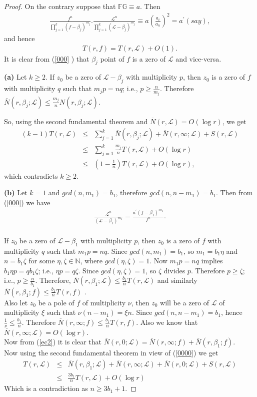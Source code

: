 \documentclass[a4paper,draft]{amsproc}
\theoremstyle{plain}
\theoremstyle{definition}
\theoremstyle{remark}
\newcommand{\ol}{\overline}
\newcommand{\bea}{\begin{eqnarray}}
\newcommand{\eea}{\end{eqnarray}}
\renewcommand{\d}{\displaystyle}
\numberwithin{equation}{section}
\renewcommand{\leq}{\leqslant}\renewcommand{\geq}{\geqslant}
\begin{document}
\begin{proof}
On the contrary suppose that $\mathbb{F} \mathbb{G}\equiv a$. Then 
\bea\label{000} \d\frac{f^n}{\prod\limits_{j=1}^{k}(f-\beta_j)^{m_{j}}}.\d\frac{\mathcal{L}^n}{\prod\limits_{j=1}^{k}(\mathcal{L}-\beta_j)^{m_{j}}}\equiv a\left(\frac{a_{i}}{a_{n}}\right)^{2}=a^{'}(say),\eea and hence   \bea\label{0000} T(r,f)= T(r,\mathcal{L})+O(1).\eea 		
It is clear from (\ref{000} ) that  $\beta_j$ point of $f$ is a zero  of $\mathcal{L}$ and vice-versa. 

{\bf(a)} Let $k\geq 2$.
If $z_0$ be a zero of $\mathcal{L}-\beta_j$ with
multiplicity $p$, then $z_0$ is a zero of $f$ with multiplicity $q$ such that $m_jp=nq$; i.e., $p\d\geq \frac{n}{m_j}$. Therefore  $\ol{N}(r,\beta_j;\mathcal{L})\leq \d\frac{m_j}{n}N(r,\beta_j;\mathcal{L})$. %

So, using the second fundamental theorem and $\ol{N}(r,\mathcal{L})=O(\log r)$, we get \bea\nonumber (k-1)T(r,\mathcal{L})&\leq& \sum_{j=1}^{k}\ol{N}(r,\beta_j;\mathcal{L})+\ol{N}(r,\infty;\mathcal{L})+S(r,\mathcal{L}) \nonumber\\ & 
\leq& \sum_{j=1}^{k}\frac{m_j}{n}T(r,\mathcal{L})+O(\log r)\nonumber\\&
\leq& (1-\frac{1}{n})T(r,\mathcal{L})+O(\log r)\nonumber,
\eea
which  contradicts $k\geq2$.

{\bf(b)} Let $k=1$ and $gcd(n,m_1)=b_1$, therefore $gcd(n,n-m_1)=b_1$. Then from (\ref{000}) we have 
\bea\label{ec2} \frac{\mathcal{L}^n}{(\mathcal{L}-\beta_1)^{m_1}}=\frac{a^{'}(f-\beta_1)^{m_1}}{f^n}. \eea\\
If $z_0$ be a zero of $\mathcal{L}-\beta_1$ with
multiplicity $p$, then $z_0$ is a zero of $f$ with multiplicity $q$ such that $m_1p=nq$. Since $gcd(n,m_1)=b_1$, so $m_1=b_1 \eta$ and $n=b_1 \zeta$ for some $\eta,\zeta \in \mathbb{N}$, where $gcd(\eta,\zeta)=1$. Now $m_1 p = nq$ implies $b_1\eta p=q b_1\zeta$; i.e.,  $\eta p=q\zeta$. Since $gcd(\eta,\zeta)=1$, so $\zeta$ divides $p$. Therefore $p \geq \zeta$; i.e., $p\d\geq \frac{n}{b_1}$. Therefore, $\ol{N}(r,\beta_1;\mathcal{L})\leq \frac{b_1}{n}T(r,\mathcal{L})$ and similarly $\ol{N}(r,\beta_1;f)\leq \frac{b_1}{n}T(r,f)$ .\\
Also let $z_0$ be a pole of $f$ of multiplicity $\nu$, then $z_0$ will be a zero of $\mathcal{L}$ of multiplicity $\xi$ such that $\nu (n-m_1) = \xi n$. Since $gcd(n,n-m_1)=b_1$, hence $\frac{1}{\nu}\leq \frac{b_1}{n} $. Therefore $\ol{N}(r,\infty;f)\leq \frac{b_1}{n}T(r,f).$ Also we know that $\ol{N}(r,\infty;\mathcal{L})=O(\log r).$\\
Now from (\ref{ec2}) it is clear that $\ol{N}(r,0;\mathcal{
L})= \ol{N}(r,\infty;f)+\ol{N}(r,\beta_1;f).$ \\
Now using the second fundamental theorem in view of (\ref{0000}) we get \bea T(r,\mathcal{L})&\leq& \ol{N}(r,\beta_1;\mathcal{L})+\ol{N}(r,\infty;\mathcal{L})+\ol{N}(r,0;\mathcal{L})+S(r,\mathcal{L}) \nonumber\\ & 
\leq& \frac{3b_1}{n}T(r,\mathcal{L})+O(\log r)\nonumber
\eea
Which is a contradiction as $n\geq 3b_1+1$.
\end{proof}
\end{document}
